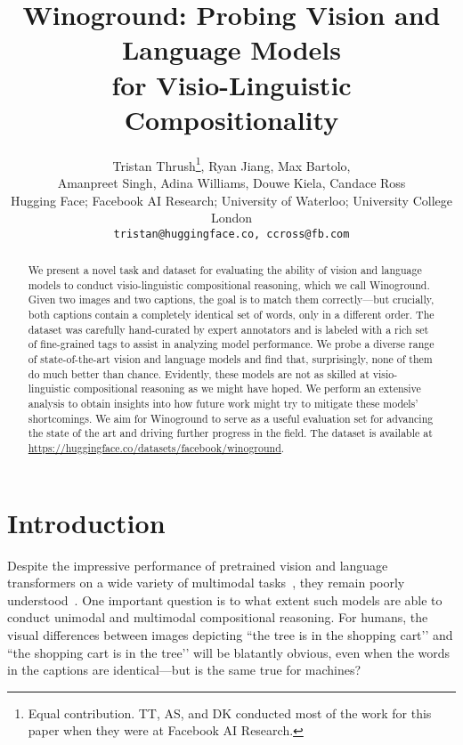 \documentclass[10pt,twocolumn,letterpaper]{article}
\begin{document}
\title{Winoground: Probing Vision and Language Models\\ for Visio-Linguistic Compositionality} 

\newcommand*\samethanks[1][\value{footnote}]{\footnotemark[#1]}
\author{Tristan Thrush\thanks{Equal contribution. TT, AS, and DK conducted most of the work for this paper when they were at Facebook AI Research.}, Ryan Jiang, Max Bartolo,\\ Amanpreet Singh, Adina Williams, Douwe Kiela, Candace Ross\samethanks\\
 Hugging Face;  Facebook AI Research;  University of Waterloo;  University College London\\
{\tt\small tristan@huggingface.co, ccross@fb.com}
}
\maketitle



\begin{abstract}
We present a novel task and dataset for evaluating the ability of vision and language models to 
conduct visio-linguistic compositional reasoning, which we call Winoground. Given two images and two captions, the goal is to match them correctly---but crucially, both captions contain a completely identical set of words, only in a different order. The dataset was carefully hand-curated by expert annotators and is labeled with a rich set of fine-grained tags to assist in analyzing model performance. We probe a diverse range of state-of-the-art vision and language models and find that, surprisingly, none of them do much better than chance. Evidently, these models are not as skilled at visio-linguistic compositional reasoning as we might have hoped. We perform an extensive analysis to obtain insights into how future work might try to mitigate these models' shortcomings. We aim for Winoground to serve as a useful evaluation set for advancing the state of the art and driving further progress in the field. The dataset is available at \scriptsize{\url{https://huggingface.co/datasets/facebook/winoground}}.
\end{abstract}

\section{Introduction}
\label{sec:intro}

Despite the impressive performance of pretrained vision and language transformers on a wide variety of multimodal tasks~\cite{lu2019vilbert, li2019visualbert, radford2021clip}, they remain poorly understood~\cite{dou2021empirical,cao2020behind,li2020closer,singh2020we}. One important question is to what extent such models are able to conduct unimodal and multimodal compositional reasoning. For humans, the visual differences between images depicting ``the tree is in the shopping cart’’ and ``the shopping cart is in the tree’’ will be blatantly obvious, even when the words in the captions are identical---but is the same true for machines?
\end{document}
